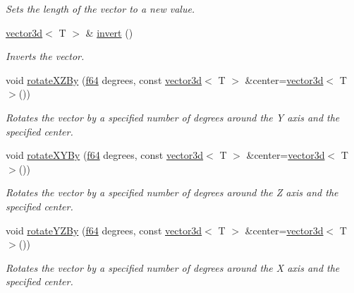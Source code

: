 \begin{DoxyCompactItemize}
\begin{DoxyCompactList}\small\item\em Sets the length of the vector to a new value. \end{DoxyCompactList}\item 
\hyperlink{classirr_1_1core_1_1vector3d}{vector3d}$<$ T $>$ \& \hyperlink{classirr_1_1core_1_1vector3d_a55a10e03bc09f87b95fc81ea0d508722}{invert} ()\hypertarget{classirr_1_1core_1_1vector3d_a55a10e03bc09f87b95fc81ea0d508722}{}\label{classirr_1_1core_1_1vector3d_a55a10e03bc09f87b95fc81ea0d508722}

\begin{DoxyCompactList}\small\item\em Inverts the vector. \end{DoxyCompactList}\item 
void \hyperlink{classirr_1_1core_1_1vector3d_a621fbddb42814edd3d14410252cf7b7a}{rotate\+X\+Z\+By} (\hyperlink{namespaceirr_a1325b02603ad449f92c68fc640af9b28}{f64} degrees, const \hyperlink{classirr_1_1core_1_1vector3d}{vector3d}$<$ T $>$ \&center=\hyperlink{classirr_1_1core_1_1vector3d}{vector3d}$<$ T $>$())
\begin{DoxyCompactList}\small\item\em Rotates the vector by a specified number of degrees around the Y axis and the specified center. \end{DoxyCompactList}\item 
void \hyperlink{classirr_1_1core_1_1vector3d_ac38b75735ec06716305fbb09ec71784d}{rotate\+X\+Y\+By} (\hyperlink{namespaceirr_a1325b02603ad449f92c68fc640af9b28}{f64} degrees, const \hyperlink{classirr_1_1core_1_1vector3d}{vector3d}$<$ T $>$ \&center=\hyperlink{classirr_1_1core_1_1vector3d}{vector3d}$<$ T $>$())
\begin{DoxyCompactList}\small\item\em Rotates the vector by a specified number of degrees around the Z axis and the specified center. \end{DoxyCompactList}\item 
void \hyperlink{classirr_1_1core_1_1vector3d_aaa048312f75f152861479cb48e2ddfe4}{rotate\+Y\+Z\+By} (\hyperlink{namespaceirr_a1325b02603ad449f92c68fc640af9b28}{f64} degrees, const \hyperlink{classirr_1_1core_1_1vector3d}{vector3d}$<$ T $>$ \&center=\hyperlink{classirr_1_1core_1_1vector3d}{vector3d}$<$ T $>$())
\begin{DoxyCompactList}\small\item\em Rotates the vector by a specified number of degrees around the X axis and the specified center. \end{DoxyCompactList}\item 

\end{DoxyCompactItemize}
